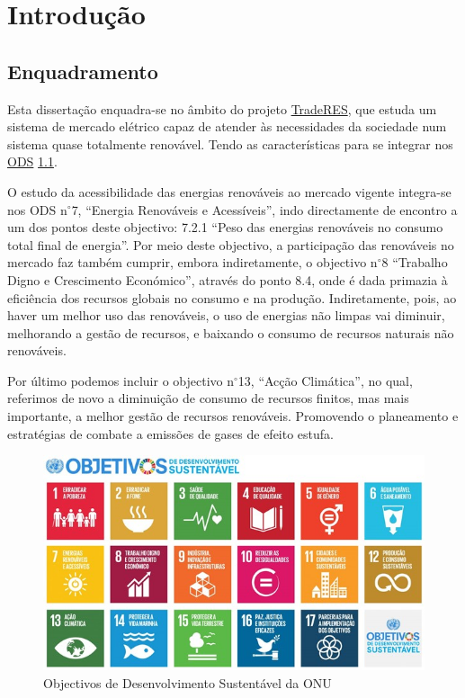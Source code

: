 \chapter{Introdução}

\section{Enquadramento\label{se:enquadramento}}
Esta dissertação enquadra-se no âmbito do projeto \href{https://traderes.eu/}{TradeRES}, que estuda um sistema de mercado elétrico capaz de atender às necessidades da sociedade num sistema quase totalmente renovável. Tendo as características para se integrar nos \href{https://ods.pt/ods/}{ \gls{ODS}} \ref{fig:ODS}.\par
O estudo da acessibilidade das energias renováveis ao mercado vigente integra-se nos \gls{ODS} n$^{\circ}$7, “Energia Renováveis e Acessíveis”, indo directamente de encontro a um dos pontos deste objectivo: 7.2.1 “Peso das energias renováveis no consumo total final de energia”. Por meio deste objectivo, a participação das renováveis no mercado faz também cumprir, embora indiretamente, o objectivo n$^{\circ}$8 “Trabalho Digno e Crescimento Económico”, através do ponto 8.4, onde é dada primazia à eficiência dos recursos globais no consumo e na produção. Indiretamente, pois, ao haver um melhor uso das renováveis, o uso de energias não limpas vai diminuir, melhorando a gestão de recursos, e baixando o consumo de recursos naturais não renováveis.\par
Por último podemos incluir o objectivo n$^{\circ}$13, “Acção Climática”, no qual, referimos de novo a diminuição de consumo de recursos finitos, mas mais importante, a melhor gestão de recursos renováveis. Promovendo o planeamento e estratégias de combate a emissões de gases de efeito estufa.\par

\begin{figure}[h]
    \centering
    \includegraphics{Imagens/DesenvolvimentoSustentavel.jpg}
    \caption{Objectivos de Desenvolvimento Sustentável da ONU}
    \label{fig:ODS}
\end{figure}

